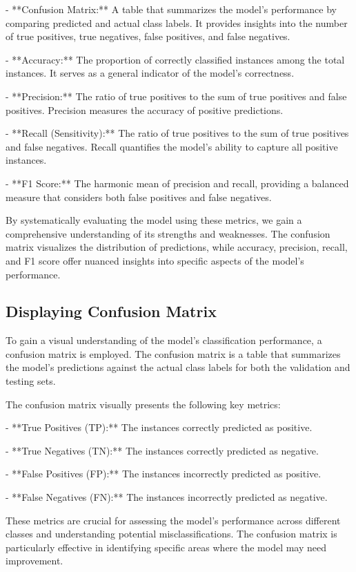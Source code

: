 \documentclass{article}
\begin{document}
- **Confusion Matrix:** A table that summarizes the model's performance by comparing predicted and actual class labels. It provides insights into the number of true positives, true negatives, false positives, and false negatives.

- **Accuracy:** The proportion of correctly classified instances among the total instances. It serves as a general indicator of the model's correctness.

- **Precision:** The ratio of true positives to the sum of true positives and false positives. Precision measures the accuracy of positive predictions.

- **Recall (Sensitivity):** The ratio of true positives to the sum of true positives and false negatives. Recall quantifies the model's ability to capture all positive instances.

- **F1 Score:** The harmonic mean of precision and recall, providing a balanced measure that considers both false positives and false negatives.

By systematically evaluating the model using these metrics, we gain a comprehensive understanding of its strengths and weaknesses. The confusion matrix visualizes the distribution of predictions, while accuracy, precision, recall, and F1 score offer nuanced insights into specific aspects of the model's performance.

\subsection{Displaying Confusion Matrix}
To gain a visual understanding of the model's classification performance, a confusion matrix is employed. The confusion matrix is a table that summarizes the model's predictions against the actual class labels for both the validation and testing sets.

The confusion matrix visually presents the following key metrics:

- **True Positives (TP):** The instances correctly predicted as positive.
  
- **True Negatives (TN):** The instances correctly predicted as negative.

- **False Positives (FP):** The instances incorrectly predicted as positive.

- **False Negatives (FN):** The instances incorrectly predicted as negative.

These metrics are crucial for assessing the model's performance across different classes and understanding potential misclassifications. The confusion matrix is particularly effective in identifying specific areas where the model may need improvement.
\end{document}
